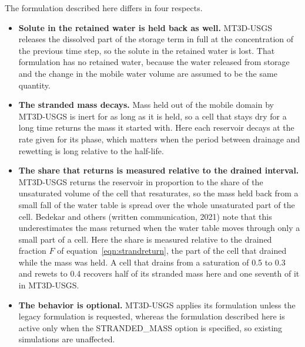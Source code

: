 The formulation described here differs in four respects.

\begin{itemize}

\item \textbf{Solute in the retained water is held back as well.} MT3D-USGS releases the dissolved part of the storage term in full at the concentration of the previous time step, so the solute in the retained water is lost. That formulation has no retained water, because the water released from storage and the change in the mobile water volume are assumed to be the same quantity.

\item \textbf{The stranded mass decays.} Mass held out of the mobile domain by MT3D-USGS is inert for as long as it is held, so a cell that stays dry for a long time returns the mass it started with. Here each reservoir decays at the rate given for its phase, which matters when the period between drainage and rewetting is long relative to the half-life.

\item \textbf{The share that returns is measured relative to the drained interval.} MT3D-USGS returns the reservoir in proportion to the share of the unsaturated volume of the cell that resaturates, so the mass held back from a small fall of the water table is spread over the whole unsaturated part of the cell. Bedekar and others (written communication, 2021) note that this underestimates the mass returned when the water table moves through only a small part of a cell. Here the share is measured relative to the drained fraction $F$ of equation~\ref{eqn:strandreturn}, the part of the cell that drained while the mass was held. A cell that drains from a saturation of 0.5 to 0.3 and rewets to 0.4 recovers half of its stranded mass here and one seventh of it in MT3D-USGS.

\item \textbf{The behavior is optional.} MT3D-USGS applies its formulation unless the legacy formulation is requested, whereas the formulation described here is active only when the STRANDED\_MASS option is specified, so existing simulations are unaffected.

\end{itemize}

